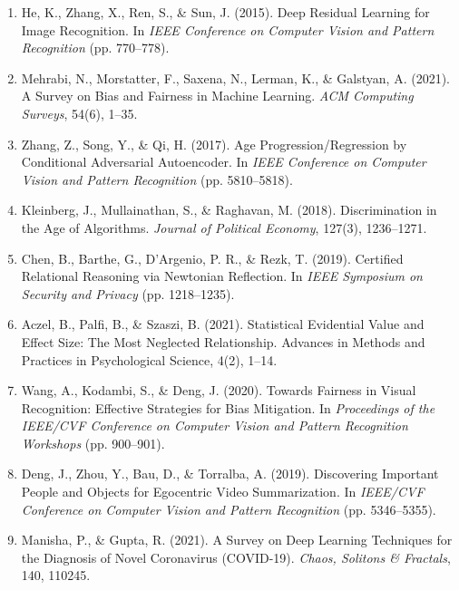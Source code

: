 \documentclass[11pt,a4paper,oneside]{report}
\begin{document}
\begin{enumerate}
\item He, K., Zhang, X., Ren, S., \& Sun, J. (2015). Deep Residual Learning for Image Recognition. In \textit{IEEE Conference on Computer Vision and Pattern Recognition} (pp. 770--778).

\item Mehrabi, N., Morstatter, F., Saxena, N., Lerman, K., \& Galstyan, A. (2021). A Survey on Bias and Fairness in Machine Learning. \textit{ACM Computing Surveys}, 54(6), 1--35.

\item Zhang, Z., Song, Y., \& Qi, H. (2017). Age Progression/Regression by Conditional Adversarial Autoencoder. In \textit{IEEE Conference on Computer Vision and Pattern Recognition} (pp. 5810--5818).

\item Kleinberg, J., Mullainathan, S., \& Raghavan, M. (2018). Discrimination in the Age of Algorithms. \textit{Journal of Political Economy}, 127(3), 1236--1271.

\item Chen, B., Barthe, G., D'Argenio, P. R., \& Rezk, T. (2019). Certified Relational Reasoning via Newtonian Reflection. In \textit{IEEE Symposium on Security and Privacy} (pp. 1218--1235).

\item Aczel, B., Palfi, B., \& Szaszi, B. (2021). Statistical Evidential Value and Effect Size: The Most Neglected Relationship. Advances in Methods and Practices in Psychological Science, 4(2), 1--14.

\item Wang, A., Kodambi, S., \& Deng, J. (2020). Towards Fairness in Visual Recognition: Effective Strategies for Bias Mitigation. In \textit{Proceedings of the IEEE/CVF Conference on Computer Vision and Pattern Recognition Workshops} (pp. 900--901).

\item Deng, J., Zhou, Y., Bau, D., \& Torralba, A. (2019). Discovering Important People and Objects for Egocentric Video Summarization. In \textit{IEEE/CVF Conference on Computer Vision and Pattern Recognition} (pp. 5346--5355).

\item Manisha, P., \& Gupta, R. (2021). A Survey on Deep Learning Techniques for the Diagnosis of Novel Coronavirus (COVID-19). \textit{Chaos, Solitons \& Fractals}, 140, 110245.

\end{enumerate}
\end{document}
